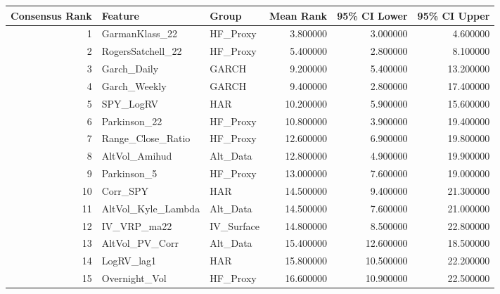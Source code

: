 \begin{tabular}{rllrrr}
\toprule
Consensus Rank & Feature & Group & Mean Rank & 95\% CI Lower & 95\% CI Upper \\
\midrule
1 & GarmanKlass\_22 & HF\_Proxy & 3.800000 & 3.000000 & 4.600000 \\
2 & RogersSatchell\_22 & HF\_Proxy & 5.400000 & 2.800000 & 8.100000 \\
3 & Garch\_Daily & GARCH & 9.200000 & 5.400000 & 13.200000 \\
4 & Garch\_Weekly & GARCH & 9.400000 & 2.800000 & 17.400000 \\
5 & SPY\_LogRV & HAR & 10.200000 & 5.900000 & 15.600000 \\
6 & Parkinson\_22 & HF\_Proxy & 10.800000 & 3.900000 & 19.400000 \\
7 & Range\_Close\_Ratio & HF\_Proxy & 12.600000 & 6.900000 & 19.800000 \\
8 & AltVol\_Amihud & Alt\_Data & 12.800000 & 4.900000 & 19.900000 \\
9 & Parkinson\_5 & HF\_Proxy & 13.000000 & 7.600000 & 19.000000 \\
10 & Corr\_SPY & HAR & 14.500000 & 9.400000 & 21.300000 \\
11 & AltVol\_Kyle\_Lambda & Alt\_Data & 14.500000 & 7.600000 & 21.000000 \\
12 & IV\_VRP\_ma22 & IV\_Surface & 14.800000 & 8.500000 & 22.800000 \\
13 & AltVol\_PV\_Corr & Alt\_Data & 15.400000 & 12.600000 & 18.500000 \\
14 & LogRV\_lag1 & HAR & 15.800000 & 10.500000 & 22.200000 \\
15 & Overnight\_Vol & HF\_Proxy & 16.600000 & 10.900000 & 22.500000 \\
\bottomrule
\end{tabular}
